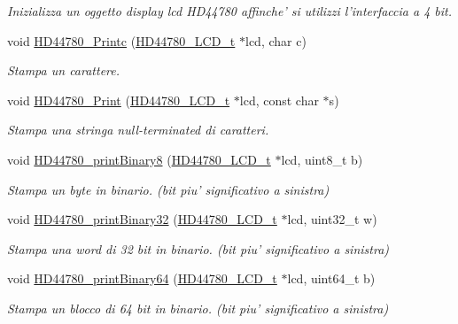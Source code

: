 \begin{DoxyCompactItemize}
\begin{DoxyCompactList}\small\item\em Inizializza un oggetto display lcd H\+D44780 affinche' si utilizzi l'interfaccia a 4 bit. \end{DoxyCompactList}\item 
void \hyperlink{group___h_d44780_ga57b8c6ca0b3c12e5f7273b3c373a6f17}{H\+D44780\+\_\+\+Printc} (\hyperlink{struct_h_d44780___l_c_d__t}{H\+D44780\+\_\+\+L\+C\+D\+\_\+t} $\ast$lcd, char c)
\begin{DoxyCompactList}\small\item\em Stampa un carattere. \end{DoxyCompactList}\item 
void \hyperlink{group___h_d44780_ga3aedff8e2040e62db569fde955d3987b}{H\+D44780\+\_\+\+Print} (\hyperlink{struct_h_d44780___l_c_d__t}{H\+D44780\+\_\+\+L\+C\+D\+\_\+t} $\ast$lcd, const char $\ast$s)
\begin{DoxyCompactList}\small\item\em Stampa una stringa null-\/terminated di caratteri. \end{DoxyCompactList}\item 
void \hyperlink{group___h_d44780_ga2a5d4d528175321c46c790b581959e63}{H\+D44780\+\_\+print\+Binary8} (\hyperlink{struct_h_d44780___l_c_d__t}{H\+D44780\+\_\+\+L\+C\+D\+\_\+t} $\ast$lcd, uint8\+\_\+t b)
\begin{DoxyCompactList}\small\item\em Stampa un byte in binario. (bit piu' significativo a sinistra) \end{DoxyCompactList}\item 
void \hyperlink{group___h_d44780_ga95cceef2401c5519295e5a83c6688b5c}{H\+D44780\+\_\+print\+Binary32} (\hyperlink{struct_h_d44780___l_c_d__t}{H\+D44780\+\_\+\+L\+C\+D\+\_\+t} $\ast$lcd, uint32\+\_\+t w)
\begin{DoxyCompactList}\small\item\em Stampa una word di 32 bit in binario. (bit piu' significativo a sinistra) \end{DoxyCompactList}\item 
void \hyperlink{group___h_d44780_ga0f99bc5458acb172d0f3bfeb94f90e2a}{H\+D44780\+\_\+print\+Binary64} (\hyperlink{struct_h_d44780___l_c_d__t}{H\+D44780\+\_\+\+L\+C\+D\+\_\+t} $\ast$lcd, uint64\+\_\+t b)
\begin{DoxyCompactList}\small\item\em Stampa un blocco di 64 bit in binario. (bit piu' significativo a sinistra) \end{DoxyCompactList}\item 

\end{DoxyCompactItemize}
